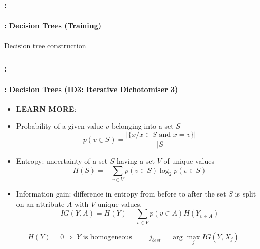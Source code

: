 \documentclass[xcolor=table]{beamer}
\begin{document}
\begin{frame}
	\frametitle{\insertshortsubtitle: \insertsection}
	\framesubtitle{\insertsubsection: Decision Trees (Training)}

	\begin{block}{Decision tree construction}
		\scriptsize
		\begin{algorithm}[H]
			
			\Return {}\;
			
			
		\end{algorithm}
	\end{block}
	
\end{frame}

\begin{frame}
	\frametitle{\insertshortsubtitle: \insertsection}
	\framesubtitle{\insertsubsection: Decision Trees (ID3: Iterative Dichotomiser 3)}
	
	\begin{itemize}
		\item \textbf{LEARN MORE}: \cite{1986-quinlan}
		\item Probability of a given value $ v $ belonging into a set $ S $
		\[p(v\in S) = \frac{|\{x / x\in S \text{ and } x = v\}|}{|S|}\]
		\item Entropy: uncertainty of a set $ S $ having a set $ V $ of unique values
		\[H(S) = - \sum\limits_{v \in V} p(v\in S) \log_2 p(v\in S)\]
		\item Information gain: difference in entropy from before to after the set $ S $ is split on an attribute $ A $ with $ V $ unique values.
		\[IG(Y, A) = H(Y) - \sum_{v \in V} p(v\in A) H(Y_{v\in A})\] 
	\end{itemize}

	\[H(Y) = 0 \Rightarrow\ Y \text{ is homogeneous} \hspace{1cm} j_{best} = \arg\max_j IG(Y, X_j)\]
	
\end{frame}
\end{document}
